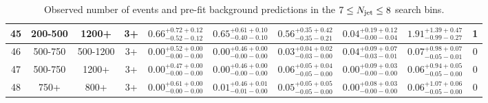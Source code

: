 \documentclass[11pt, oneside]{article}   	%
\newcommand{\njets}{\ensuremath{N_{\rm jet}}\xspace}
\begin{document}
\begin{table}
{\begin{tabular}{ |c|c|c|c||c|c|c|c||c|c| }
45 & 200-500 & 1200+ & 3+ & $0.66^{+0.72+0.12}_{-0.52-0.12}$ & $0.65^{+0.61+0.10}_{-0.40-0.10}$ & $0.56^{+0.35+0.42}_{-0.35-0.21}$ & $0.04^{+0.19+0.12}_{-0.00-0.04}$ & $1.91^{+1.39+0.47}_{-0.99-0.27}$ & 1 \\ \hline
46 & 500-750 & 500-1200 & 3+ & $0.00^{+0.52+0.00}_{-0.00-0.00}$ & $0.00^{+0.46+0.00}_{-0.00-0.00}$ & $0.03^{+0.04+0.02}_{-0.03-0.00}$ & $0.04^{+0.09+0.07}_{-0.03-0.01}$ & $0.07^{+0.98+0.07}_{-0.05-0.01}$ & 0 \\ \hline
47 & 500-750 & 1200+ & 3+ & $0.00^{+0.47+0.00}_{-0.00-0.00}$ & $0.00^{+0.46+0.00}_{-0.00-0.00}$ & $0.06^{+0.05+0.04}_{-0.05-0.00}$ & $0.00^{+0.09+0.03}_{-0.00-0.00}$ & $0.06^{+0.94+0.05}_{-0.05-0.00}$ & 0 \\ \hline
48 & 750+ & 800+ & 3+ & $0.00^{+0.61+0.00}_{-0.00-0.00}$ & $0.01^{+0.46+0.01}_{-0.01-0.00}$ & $0.05^{+0.05+0.05}_{-0.05-0.00}$ & $0.00^{+0.08+0.03}_{-0.00-0.00}$ & $0.06^{+1.07+0.06}_{-0.05-0.00}$ & 0 \\ \hline
\end{tabular}
}
\caption{Observed number of events and pre-fit background predictions in the $7\leq\njets\leq8$ search bins.}
\end{table}
\end{document}
